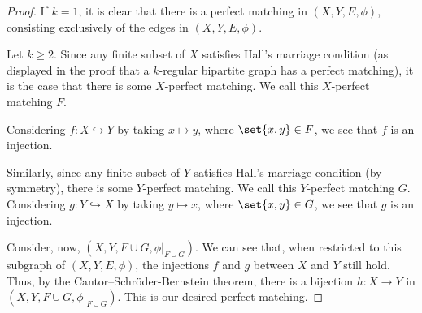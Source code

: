 \documentclass[10pt]{mypackage}
\begin{document}
  \begin{proof}
    If $k = 1$, it is clear that there is a perfect matching in $(X,Y,E,\phi)$, consisting exclusively of the edges in $(X,Y,E,\phi)$.\newline

    Let $k\geq 2$. Since any finite subset of $X$ satisfies Hall's marriage condition (as displayed in the proof that a $k$-regular bipartite graph has a perfect matching), it is the case that there is some $X$-perfect matching. We call this $X$-perfect matching $F$.\newline

    Considering $f: X\hookrightarrow Y$ by taking $x \mapsto y$, where $\set{x,y}\in F$, we see that $f$ is an injection.\newline

    Similarly, since any finite subset of $Y$ satisfies Hall's marriage condition (by symmetry), there is some $Y$-perfect matching. We call this $Y$-perfect matching $G$. Considering $g: Y\hookrightarrow X$ by taking $y\mapsto x$, where $\set{x,y}\in G$, we see that $g$ is an injection.\newline

    Consider, now, $\left(X,Y,F\cup G,\phi\vert_{F\cup G}\right)$. We can see that, when restricted to this subgraph of $(X,Y,E,\phi)$, the injections $f$ and $g$ between $X$ and $Y$ still hold. Thus, by the Cantor--Schröder-Bernstein theorem, there is a bijection $h: X\rightarrow Y$ in $\left(X,Y,F\cup G,\phi\vert_{F\cup G}\right)$. This is our desired perfect matching.
  \end{proof}
\end{document}
